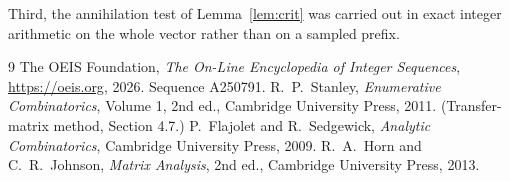 \documentclass[11pt,a4paper]{article}
\theoremstyle{plain}
\theoremstyle{definition}
\begin{document}
Third, the annihilation test of Lemma~\ref{lem:crit} was carried out in exact integer
arithmetic on the whole vector rather than on a sampled prefix.

\begin{thebibliography}{9}
 The OEIS Foundation, \emph{The On-Line Encyclopedia of Integer
Sequences}, \url{https://oeis.org}, 2026. Sequence A250791.
 R.~P.~Stanley, \emph{Enumerative Combinatorics}, Volume 1, 2nd ed.,
Cambridge University Press, 2011. (Transfer-matrix method, Section 4.7.)
 P.~Flajolet and R.~Sedgewick, \emph{Analytic Combinatorics}, Cambridge
University Press, 2009.
 R.~A.~Horn and C.~R.~Johnson, \emph{Matrix Analysis}, 2nd ed., Cambridge
University Press, 2013.
\end{thebibliography}
\end{document}

